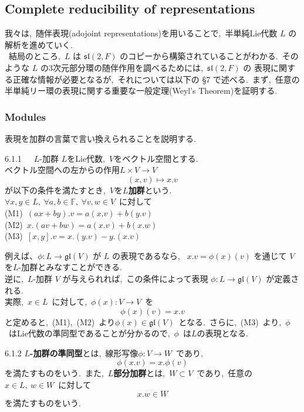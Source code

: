 \documentclass[uplatex,dvipdfmx]{jsarticle}
\begin{document}
\subsection{Complete reducibility of representations}
我々は,~随伴表現(adojoint representations)を用いることで,~半単純Lie代数 $L$ の解析を進めていく.\\
~結局のところ,~$L$ は $\mathfrak{sl}(2, F)$ のコピーから構築されていることがわかる.~そのような $L$ の3次元部分環の随伴作用を調べるためには,~$\mathfrak{sl}(2, F)$ の
表現に関する正確な情報が必要となるが,~それについては以下の §7 で述べる.~まず,~任意の半単純リー環の表現に関する重要な一般定理(Weyl's Theorem)を証明する.
\subsubsection{Modules}
表現を加群の言葉で言い換えられることを説明する.
\begin{mydef}{6.1.1~~~$L$-加群}
    $L$をLie代数,~$V$をベクトル空間とする.\\
    ベクトル空間への左からの作用$L\times V \to V$
    \begin{equation*}
        (x,v)\mapsto x. v
    \end{equation*}
    が以下の条件を満たすとき,~$V$を\textbf{$L$加群}という.\\
    $\forall x,y\in L,~\forall a,b\in \mathbb{F},~\forall v,w\in V$~に対して\\
    (M1)~$(ax + by).v = a(x.v) + b(y.v)$\\
    (M2)~$x.(av + bw) = a(x.v) + b(x.w)$\\
    (M3)~$[x,y].v = x.(y.v) - y.(x.v)$
\end{mydef}
例えば、$\phi: L \to \mathfrak{gl}(V)$ が $L$ の表現であるなら,~ $x.v = \phi(x)(v)$ を通じて $V$を$L$-加群とみなすことができる.\\
逆に,~$L$-加群 $V$ が与えられれば,~この条件によって表現 $\phi: L \to \mathfrak{gl}(V)$ が定義される.\\
実際,~$x\in L$~に対して,~$\phi(x): V \to V$~を
\begin{equation*}
    \phi(x)(v) = x.v
\end{equation*}
と定めると,~(M1),~(M2)~より$\phi(x)\in \mathfrak{gl}(V)$~となる.~さらに,~(M3)~より,~$\phi$~はLie代数の準同型であることが分かるので,~$\phi$~は$L$の表現となる.\\
\begin{mydef}{6.1.2}
    \textbf{$L$-加群の準同型}とは,~線形写像$\phi:V\to W$~であり,
    \begin{equation*}
        \phi(x.v)=x.\phi(v)
    \end{equation*}
    を満たすものをいう.~また,~\textbf{$L$部分加群}とは,~$W\subset V$~であり,~任意の$x\in L,~w\in W$~に対して
    \begin{equation*}
        x.w\in W
    \end{equation*}
    を満たすものをいう.
\end{mydef}
\end{document}
